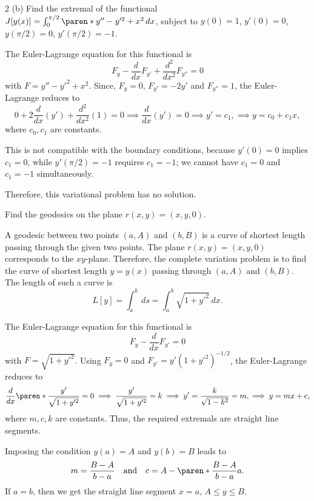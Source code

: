 \documentclass[11pt]{penrose}
\begin{document}
\begin{problem}{2 (b)}
    Find the extremal of the functional $J[y(x)] = \int_0^{\pi/2} \paren*{y'' - y'^2 + x^2} \,dx$, subject to $y(0) = 1$, $y'(0) = 0$, $y(\pi/2) = 0$, $y'(\pi/2) = -1$.

    \solution
    The Euler-Lagrange equation for this functional is
    \begin{equation*}
        F_{y} - \frac{d}{dx}F_{y'} + \frac{d^2}{dx^2}F_{y''} = 0
    \end{equation*}
    with $F = y'' - y'^2 + x^2$. Since, $F_{y} = 0$, $F_{y'} = -2y'$ and $F_{y''} = 1$, the Euler-Lagrange reduces to
    \begin{equation*}
        0 + 2\frac{d}{dx}(y') + \frac{d^2}{dx^2}(1) = 0
        \implies
        \frac{d}{dx}(y') = 0
        \implies
        y' = c_1,
        \implies
        y = c_0 + c_1 x,
    \end{equation*}
    where $c_0, c_1$ are constants.

    This is not compatible with the boundary conditions, because $y'(0)=0$ implies $c_1 = 0$, while $y'(\pi/2) = -1$ requires $c_1 = -1$; we cannot have $c_1 = 0$ and $c_1 = -1$ simultaneously.

    Therefore, this variational problem has no solution.
\end{problem}

\begin{problem}{3}
    Find the geodesics on the plane $r(x,y) = (x,y,0)$.

    \solution A geodesic between two points $(a, A)$ and $(b, B)$ is a curve of shortest length passing through the given two points. The plane $r(x,y) = (x,y,0)$ corresponds to the $xy$-plane. Therefore, the complete variation problem is to find the curve of shortest length $y = y(x)$ passing through $(a, A)$ and $(b, B)$. The length of such a curve is
    \begin{equation*}
        L[y] = \int_a^b \,ds
        = \int_a^b \sqrt{1 + y'^2} \,dx.
    \end{equation*}

    The Euler-Lagrange equation for this functional is
    \begin{equation*}
        F_{y} - \frac{d}{dx}F_{y'} = 0
    \end{equation*}
    with $F = \sqrt{1 + y'^2}$. Using $F_{y} = 0$ and $F_{y'} = y' (1 + y'^2)^{-1/2}$, the Euler-Lagrange reduces to
    \begin{equation*}
        \frac{d}{dx}\paren*{\frac{y'}{\sqrt{1 + y'^2}}} = 0
        \implies
        \frac{y'}{\sqrt{1 + y'^2}} = k
        \implies
        y' = \frac{k}{\sqrt{1 - k^2}} = m,
        \implies
        y = m x + c,
    \end{equation*}
    where $m, c, k$ are constants. Thus, the required extremals are straight line segments.

    Imposing the condition $y(a) = A$ and $y(b) = B$ leads to
    \begin{equation*}
        m = \frac{B - A}{b - a}
        \quad\text{and}\quad
        c = A - \paren*{\frac{B - A}{b - a}}a.
    \end{equation*}
    If $a = b$, then we get the straight line segment $x = a$, $A \leq y \leq B$.
\end{problem}
\end{document}
